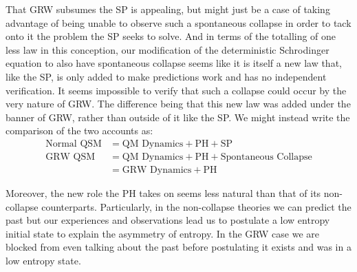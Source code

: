 \documentclass{article}
\begin{document}
That GRW subsumes the SP is appealing, but might just be a case of taking advantage of being unable to observe such a spontaneous collapse in order to tack onto it the problem the SP seeks to solve. And in terms of the totalling of one less law in this conception, our modification of the deterministic Schrodinger equation to also have spontaneous collapse seems like it is itself a new law that, like the SP, is only added to make predictions work and has no independent verification. It seems impossible to verify that such a collapse could occur by the very nature of GRW. The difference being that this new law was added under the banner of GRW, rather than outside of it like the SP. We might instead write the comparison of the two accounts as:
\begin{align*}
  \text{Normal QSM}&=\text{QM Dynamics}+\text{PH}+\text{SP}\\
  \text{GRW QSM}&=\text{QM Dynamics}+\text{PH}+\text{Spontaneous Collapse}\\
  &=\text{GRW Dynamics}+\text{PH}
\end{align*}

Moreover, the new role the PH takes on seems less natural than that of its non-collapse counterparts. Particularly, in the non-collapse theories we can predict the past but our experiences and observations lead us to postulate a low entropy initial state to explain the asymmetry of entropy. In the GRW case we are blocked from even talking about the past before postulating it exists and was in a low entropy state.



\end{document}
